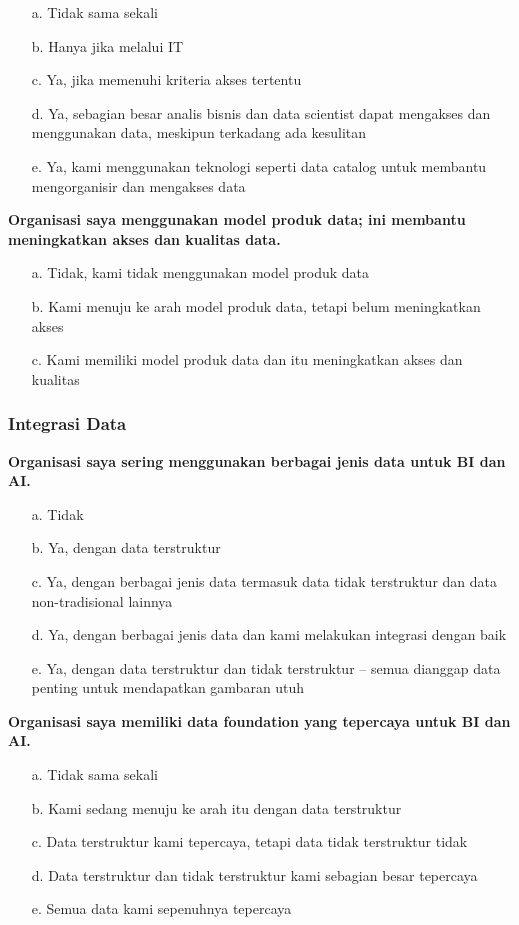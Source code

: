 \documentclass{article}
\begin{document}
\begin{enumerate}
	\item[a.] Tidak sama sekali
	\item[b.] Hanya jika melalui IT
	\item[c.] Ya, jika memenuhi kriteria akses tertentu
	\item[d.] Ya, sebagian besar analis bisnis dan data scientist dapat mengakses dan menggunakan data, meskipun terkadang ada kesulitan
	\item[e.] Ya, kami menggunakan teknologi seperti data catalog untuk membantu mengorganisir dan mengakses data
\end{enumerate}

\textbf{Organisasi saya menggunakan model produk data; ini membantu meningkatkan akses dan kualitas data.}

\begin{enumerate}
	\item[a.] Tidak, kami tidak menggunakan model produk data
	\item[b.] Kami menuju ke arah model produk data, tetapi belum meningkatkan akses
	\item[c.] Kami memiliki model produk data dan itu meningkatkan akses dan kualitas
\end{enumerate}

\subsubsection{Integrasi Data}

\textbf{Organisasi saya sering menggunakan berbagai jenis data untuk BI dan AI.}

\begin{enumerate}
	\item[a.] Tidak
	\item[b.] Ya, dengan data terstruktur
	\item[c.] Ya, dengan berbagai jenis data termasuk data tidak terstruktur dan data non-tradisional lainnya
	\item[d.] Ya, dengan berbagai jenis data dan kami melakukan integrasi dengan baik
	\item[e.] Ya, dengan data terstruktur dan tidak terstruktur – semua dianggap data penting untuk mendapatkan gambaran utuh
\end{enumerate}

\textbf{Organisasi saya memiliki data foundation yang tepercaya untuk BI dan AI.}

\begin{enumerate}
	\item[a.] Tidak sama sekali
	\item[b.] Kami sedang menuju ke arah itu dengan data terstruktur
	\item[c.] Data terstruktur kami tepercaya, tetapi data tidak terstruktur tidak
	\item[d.] Data terstruktur dan tidak terstruktur kami sebagian besar tepercaya
	\item[e.] Semua data kami sepenuhnya tepercaya
\end{enumerate}
\end{document}
